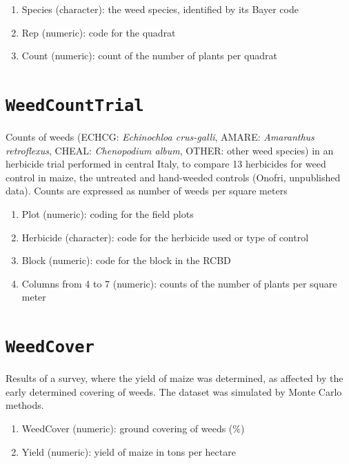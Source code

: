 \documentclass[
  letterpaper,
  DIV=11,
  numbers=noendperiod]{scrreprt}
\providecommand{\tightlist}{%
  \setlength{\itemsep}{0pt}\setlength{\parskip}{0pt}}
\begin{document}
\begin{enumerate}
\def\labelenumi{\arabic{enumi}.}
\tightlist
\item
  Species (character): the weed species, identified by its Bayer code
\item
  Rep (numeric): code for the quadrat
\item
  Count (numeric): count of the number of plants per quadrat
\end{enumerate}

\section*{\texorpdfstring{\texttt{WeedCountTrial}}{WeedCountTrial}}\label{weedcountstrial}


Counts of weeds (ECHCG: \emph{Echinochloa crus-galli}, AMARE:
\emph{Amaranthus retroflexus}, CHEAL: \emph{Chenopodium album}, OTHER:
other weed species) in an herbicide trial performed in central Italy, to
compare 13 herbicides for weed control in maize, the untreated and
hand-weeded controls (Onofri, unpublished data). Counts are expressed as
number of weeds per square meters

\begin{enumerate}
\def\labelenumi{\arabic{enumi}.}
\tightlist
\item
  Plot (numeric): coding for the field plots
\item
  Herbicide (character): code for the herbicide used or type of control
\item
  Block (numeric): code for the block in the RCBD
\item
  Columns from 4 to 7 (numeric): counts of the number of plants per
  square meter
\end{enumerate}

\section*{\texorpdfstring{\texttt{WeedCover}}{WeedCover}}\label{weedcover}


Results of a survey, where the yield of maize was determined, as
affected by the early determined covering of weeds. The dataset was
simulated by Monte Carlo methods.

\begin{enumerate}
\def\labelenumi{\arabic{enumi}.}
\tightlist
\item
  WeedCover (numeric): ground covering of weeds (\%)
\item
  Yield (numeric): yield of maize in tons per hectare
\end{enumerate}
\end{document}
